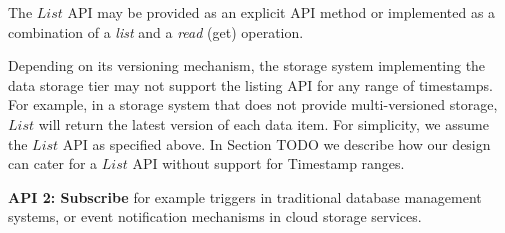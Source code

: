 The $List$ API may be provided as an explicit API method or implemented as a combination of a \textit{list} and a
\textit{read} (get) operation.

Depending on its versioning mechanism, the storage system implementing the data storage tier may not support the
listing API for any range of timestamps.
For example, in a storage system that does not provide multi-versioned storage, $List$ will return the latest version of
each data item.
For simplicity, we assume the $List$ API as specified above.
In Section
TODO
we describe how our design can cater for a $List$ API without support for Timestamp ranges.

\noindent
\textbf{API 2: Subscribe}
  for example triggers in traditional
  database management systems, or event notification mechanisms in cloud storage services.
















